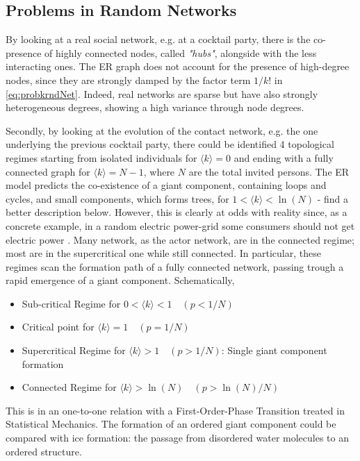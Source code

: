 \documentclass[a4paper,10pt,twoside]{book} %
\theoremstyle{definition}
\begin{document}
\subsection{Problems in Random Networks}

By looking at a real social network, e.g. at a cocktail party, there is the co-presence of highly connected nodes, called \textit{"hubs"}, alongside with the less interacting ones. The ER graph does not account for the presence of high-degree nodes\cite{barabasi::2016networkbook}, since they are strongly damped by the  factor term $1/k!$ in \autoref{eq:probkrndNet}. Indeed, real networks are sparse but have also strongly heterogeneous degrees, showing a high variance through node degrees.

Secondly, by looking at the evolution of the contact network, e.g. the one underlying the previous cocktail party, there could be identified 4 topological regimes starting from isolated individuals for $\langle k \rangle = 0$ and ending with a fully connected graph for $\langle k \rangle = N-1$, where $N$ are the total invited persons. The ER model predicts the co-existence of a giant component, containing loops and cycles, and small components, which forms trees, for $1 < \langle k\rangle < \ln(N)$ - find a better description below. However, this is clearly at odds with reality since, as a concrete example, in a random electric power-grid some consumers should not get electric power \cite{barabasi::2016networkbook}. Many network, as the actor network, are in the connected regime; most are in the supercritical one while still connected.
In particular, these regimes scan the formation path of a fully connected network, passing trough a rapid emergence of a giant component.
\newline Schematically,
\begin{itemize}[noitemsep]
	\item Sub-critical Regime for $0 < \langle k \rangle < 1 \quad (p < 1/N)$ 
	\item Critical point for $\langle k \rangle = 1 \quad (p = 1/N)$
	\item Supercritical Regime for $\langle k \rangle > 1 \quad (p > 1/N)$: Single giant component formation
	\item Connected Regime for $\langle k \rangle > \ln(N) \quad (p > \ln(N)/N)$
\end{itemize}
This is in an one-to-one relation with a First-Order-Phase Transition treated in Statistical Mechanics. The formation of an ordered giant component could be compared with ice formation: the passage from disordered water molecules to an ordered structure.
\end{document}
